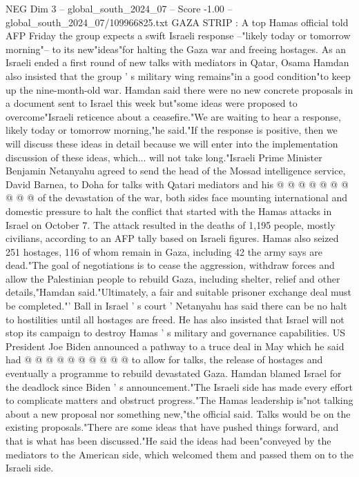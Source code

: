 \begin{textsample}{NEG Dim 3 – global\_south\_2024\_07 – Score -1.00 – global\_south\_2024\_07/109966825.txt}  \label{ex:f3_neg_142}
GAZA STRIP : A top Hamas official told AFP Friday the group expects a swift Israeli response --"likely today or tomorrow morning"-- to its new"ideas"for halting the Gaza war and freeing hostages.
As an Israeli ended a first round of new talks with mediators in Qatar, Osama Hamdan also insisted that the group ' s military wing remains"in a good condition"to keep up the nine-month-old war.
Hamdan said there were no new concrete proposals in a document sent to Israel this week but"some ideas were proposed to overcome"Israeli reticence about a ceasefire."We are waiting to hear a response, likely today or tomorrow morning,"he said."If the response is positive, then we will discuss these ideas in detail because we will enter into the implementation discussion of these ideas, which... will not take long."Israeli Prime Minister Benjamin Netanyahu agreed to send the head of the Mossad intelligence service, David Barnea, to Doha for talks with Qatari mediators and his @ @ @ @ @ @ @ @ @ @ of the devastation of the war, both sides face mounting international and domestic pressure to halt the conflict that started with the Hamas attacks in Israel on October 7.
The attack resulted in the deaths of 1,195 people, mostly civilians, according to an AFP tally based on Israeli figures.
Hamas also seized 251 hostages, 116 of whom remain in Gaza, including 42 the army says are dead."The goal of negotiations is to cease the aggression, withdraw forces and allow the Palestinian people to rebuild Gaza, including shelter, relief and other details,"Hamdan said."Ultimately, a fair and suitable prisoner exchange deal must be completed."' Ball in Israel ' s court ' Netanyahu has said there can be no halt to hostilities until all hostages are freed.
He has also insisted that Israel will not stop its campaign to destroy Hamas ' s military and governance capabilities.
US President Joe Biden announced a pathway to a truce deal in May which he said had @ @ @ @ @ @ @ @ @ @ to allow for talks, the release of hostages and eventually a programme to rebuild devastated Gaza.
Hamdan blamed Israel for the deadlock since Biden ' s announcement."The Israeli side has made every effort to complicate matters and obstruct progress."The Hamas leadership is"not talking about a new proposal nor something new,"the official said.
Talks would be on the existing proposals."There are some ideas that have pushed things forward, and that is what has been discussed."He said the ideas had been"conveyed by the mediators to the American side, which welcomed them and passed them on to the Israeli side.

\end{textsample}
